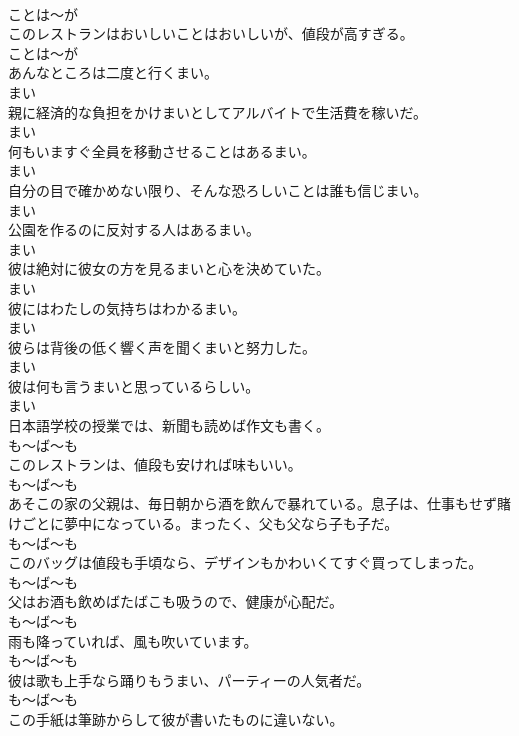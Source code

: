 \documentclass[8pt]{extreport}
\begin{document}
\begin{CJK}{UTF8}{min}
\\	ことは～が
\\	このレストランはおいしいことはおいしいが、値段が高すぎる。	
\\	ことは～が
\\	あんなところは二度と行くまい。	
\\	まい
\\	親に経済的な負担をかけまいとしてアルバイトで生活費を稼いだ。	
\\	まい
\\	何もいますぐ全員を移動させることはあるまい。	
\\	まい
\\	自分の目で確かめない限り、そんな恐ろしいことは誰も信じまい。	
\\	まい
\\	公園を作るのに反対する人はあるまい。	
\\	まい
\\	彼は絶対に彼女の方を見るまいと心を決めていた。	
\\	まい
\\	彼にはわたしの気持ちはわかるまい。	
\\	まい
\\	彼らは背後の低く響く声を聞くまいと努力した。	
\\	まい
\\	彼は何も言うまいと思っているらしい。	
\\	まい
\\	日本語学校の授業では、新聞も読めば作文も書く。	
\\	も～ば～も
\\	このレストランは、値段も安ければ味もいい。	
\\	も～ば～も
\\	あそこの家の父親は、毎日朝から酒を飲んで暴れている。息子は、仕事もせず賭けごとに夢中になっている。まったく、父も父なら子も子だ。	
\\	も～ば～も
\\	このバッグは値段も手頃なら、デザインもかわいくてすぐ買ってしまった。	
\\	も～ば～も
\\	父はお酒も飲めばたばこも吸うので、健康が心配だ。	
\\	も～ば～も
\\	雨も降っていれば、風も吹いています。	
\\	も～ば～も
\\	彼は歌も上手なら踊りもうまい、パーティーの人気者だ。	
\\	も～ば～も
\\	この手紙は筆跡からして彼が書いたものに違いない。	

\end{CJK}
\end{document}
